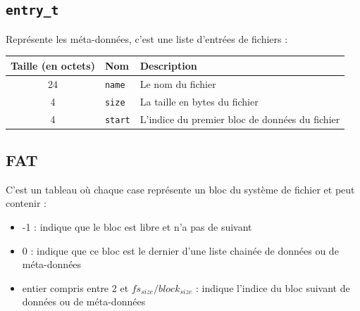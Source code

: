 \documentclass[a4paper, 12pt]{article}
\begin{document}
\subsection{\texttt{entry_t}} Représente les méta-données, c'est une liste d'entrées de fichiers :

\begin{tabular}{|c|l|p{.5\linewidth}|}	\hline
	\textbf{Taille (en octets)}	& \textbf{Nom} & \textbf{Description} \\ \hline
	24	& \texttt{name} 	& Le nom du fichier \\ \hline
	4 	& \texttt{size} 	& La taille en bytes du fichier \\ \hline
	4 	& \texttt{start} & L'indice du premier bloc de données du fichier \\ \hline
\end{tabular}

\subsection{FAT} C'est un tableau où chaque case représente un bloc du système de fichier et peut contenir :
\begin{itemize}
	\item -1 : indique que le bloc est libre et n'a pas de suivant
	\item 0 : indique que ce bloc est le dernier d'une liste chainée de données ou de méta-données
	\item entier compris entre 2 et $fs_{size} / block_{size}$ : indique l'indice du bloc suivant de données ou de méta-données
\end{itemize}
\end{document}
